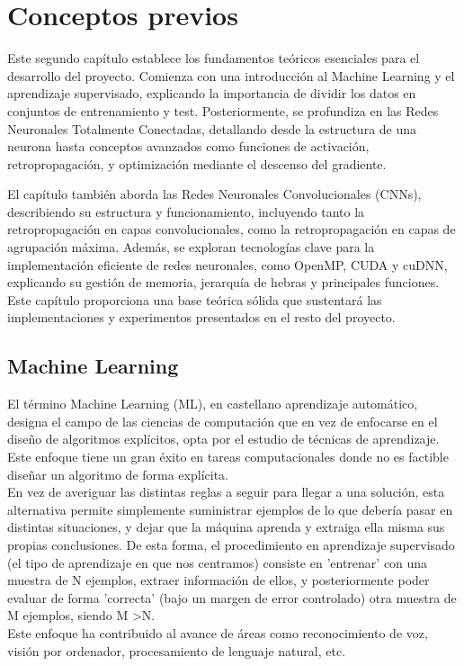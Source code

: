 \chapter{Conceptos previos}

Este segundo capítulo establece los fundamentos teóricos esenciales para el desarrollo del proyecto. Comienza con una introducción al Machine Learning y el aprendizaje supervisado, explicando la importancia de dividir los datos en conjuntos de entrenamiento y test. Posteriormente, se profundiza en las Redes Neuronales Totalmente Conectadas, detallando desde la estructura de una neurona hasta conceptos avanzados como funciones de activación, retropropagación, y optimización mediante el descenso del gradiente.

El capítulo también aborda las Redes Neuronales Convolucionales (CNNs), describiendo su estructura y funcionamiento, incluyendo tanto la retropropagación en capas convolucionales, como la retropropagación en capas de agrupación máxima. Además, se exploran tecnologías clave para la implementación eficiente de redes neuronales, como OpenMP, CUDA y cuDNN, explicando su gestión de memoria, jerarquía de hebras y principales funciones. Este capítulo proporciona una base teórica sólida que sustentará las implementaciones y experimentos presentados en el resto del proyecto.

\section{Machine Learning}

El término Machine Learning (ML), en castellano aprendizaje automático, designa el campo de las ciencias de computación que en vez de enfocarse en el diseño de algoritmos explícitos, opta por el estudio de técnicas de aprendizaje. Este enfoque tiene un gran éxito en tareas computacionales donde no es factible diseñar un algoritmo de forma explícita. \cite{Programming_Massively} \\
En vez de averiguar las distintas reglas a seguir para llegar a una solución, esta alternativa permite simplemente suministrar ejemplos de lo que debería pasar en distintas situaciones, y dejar que la máquina aprenda y extraiga ella misma sus propias conclusiones. De esta forma, el procedimiento en aprendizaje supervisado (el tipo de aprendizaje en que nos centramos) consiste en 'entrenar' con una muestra de N ejemplos, extraer información de ellos, y posteriormente poder evaluar de forma 'correcta' (bajo un margen de error controlado) otra muestra de M ejemplos, siendo M \textgreater N. \cite{Learning_From_Data} \\
Este enfoque ha contribuido al avance de áreas como reconocimiento de voz, visión por ordenador, procesamiento de lenguaje natural, etc.

